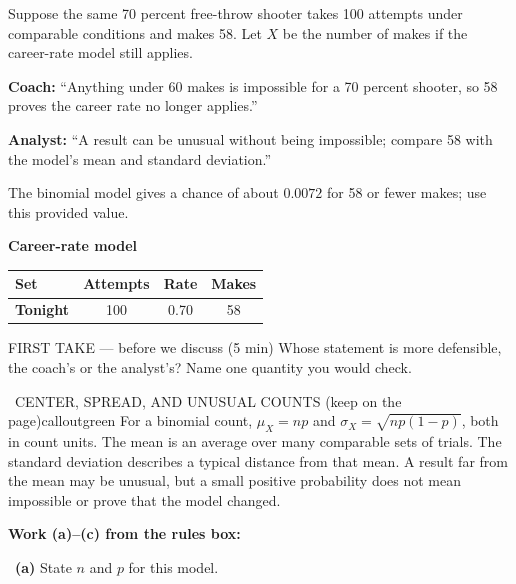 \documentclass[11pt]{article}
\begin{document}


Suppose the same 70 percent free-throw shooter takes 100 attempts under comparable conditions and makes 58. Let $X$ be the number of makes if the career-rate model still applies.\par\smallskip \textbf{Coach:} ``Anything under 60 makes is impossible for a 70 percent shooter, so 58 proves the career rate no longer applies.''\par \textbf{Analyst:} ``A result can be unusual without being impossible; compare 58 with the model's mean and standard deviation.''\par The binomial model gives a chance of about $0.0072$ for 58 or fewer makes; use this provided value.\par
\begin{center}
\textbf{Career-rate model}\par\smallskip
\begin{tabular}{|l|c|c|c|}
\hline
\textbf{Set} & \textbf{Attempts} & \textbf{Rate} & \textbf{Makes} \\ \hline
\textbf{Tonight} & 100 & 0.70 & 58 \\ \hline
\end{tabular}
\end{center}
\begin{firsttakebox}{FIRST TAKE --- before we discuss (5 min)}
Whose statement is more defensible, the coach's or the analyst's? Name one quantity you would check.
\workspace{0.9in}
\end{firsttakebox}

\begin{callout}{\IconBook\ CENTER, SPREAD, AND UNUSUAL COUNTS (keep on the page)}{calloutgreen}
For a binomial count, $\mu_X=np$ and $\sigma_X=\sqrt{np(1-p)}$, both in count units. The mean is an average over many comparable sets of trials. The standard deviation describes a typical distance from that mean. A result far from the mean may be unusual, but a small positive probability does not mean impossible or prove that the model changed.
\end{callout}

\newpage
\textbf{Work (a)--(c) from the rules box:}\par\smallskip

~\textbf{(a)} State $n$ and $p$ for this model.\par
\workspace{0.8in}
\end{document}
